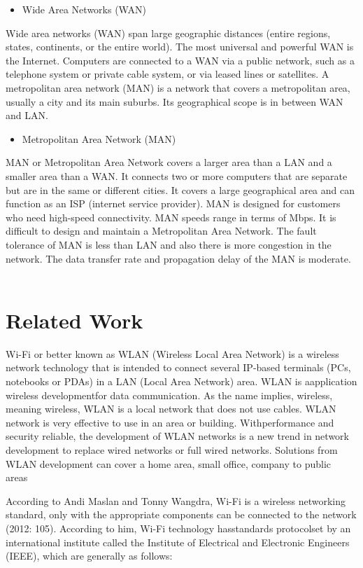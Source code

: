 \documentclass[conference]{IEEEtran}
\begin{document}
\begin{itemize}
    \item Wide Area Networks (WAN)
\end{itemize}
Wide area networks (WAN) span large geographic distances (entire regions, states, continents, or the entire world).
The most universal and powerful WAN is the Internet.
Computers are connected to a WAN via a public network, such as a telephone system or private cable system, or via leased lines or satellites.
A metropolitan area network (MAN) is a network that covers a metropolitan area, usually a city and its main suburbs.
Its geographical scope is in between WAN and LAN.
\vspace{1cm}
\begin{itemize}
    \item Metropolitan Area Network (MAN)
\end{itemize}

MAN or Metropolitan Area Network covers a larger area than a LAN and a smaller area than a WAN.
It connects two or more computers that are separate but are in the same or different cities.
It covers a large geographical area and can function as an ISP (internet service provider).
MAN is designed for customers who need high-speed connectivity.
MAN speeds range in terms of Mbps. It is difficult to design and maintain a Metropolitan Area Network.
The fault tolerance of MAN is less than LAN and also there is more congestion in the network.
The data transfer rate and propagation delay of the MAN is moderate. ~\cite{yudianto2014jaringan}


\section{Related Work}
Wi-Fi or better known as
WLAN (Wireless Local Area Network) is
a wireless network technology that is intended to
connect several IP-based terminals (PCs,
notebooks or PDAs) in a LAN (Local
Area Network) area. WLAN is aapplication
wireless developmentfor data communication.
As the name implies, wireless, meaning
wireless, WLAN is a local network that does not
use cables. WLAN network is
very effective to use in an area
or building. Withperformance and security
reliable, the development of WLAN networks
is a new trend in network development to
replace wired networks or full wired networks.
Solutions from WLAN development can cover
a home area, small office, company
to public areas~


According to Andi Maslan and Tonny Wangdra, Wi-Fi is
a wireless networking standard, only with the appropriate components can be
connected to the network (2012: 105). According to him, Wi-Fi technology hasstandards
protocolset by an international institute called the Institute of
Electrical and Electronic Engineers (IEEE), which are generally as follows:
\end{document}
